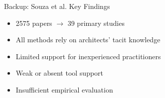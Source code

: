 \documentclass[
  xcolor={hyperref,svgnames,x11names,table},
  hyperref={pdfencoding=unicode,plainpages=false,pdfpagelabels=true,breaklinks=true},
  brazilian,english,12pt,aspectratio=149,
]{beamer}
\begin{document}
\begin{frame}{Backup: Souza et al. Key Findings}
  \begin{itemize}
    \item 2575 papers $\rightarrow$ 39 primary studies
    \item All methods rely on architects' tacit knowledge
    \item Limited support for inexperienced practitioners
    \item Weak or absent tool support
    \item Insufficient empirical evaluation
  \end{itemize}
\end{frame}
\end{document}
